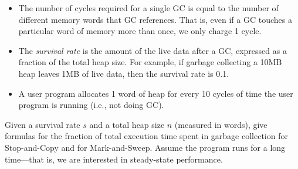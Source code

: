 \documentclass{article}
\begin{document}
\begin{enumerate}
\begin{itemize}
\item The number of cycles required for a single GC is equal to the number
of different memory words that GC references. That is, even if a GC
touches a particular word of memory more than once, we only charge 1
cycle.

\item The \emph{survival rate} is the amount of the live data after a GC,
expressed as a fraction of the total heap size. For example, if garbage
collecting a 10MB heap leaves 1MB of live data, then the survival rate is
0.1.

\item A user program allocates 1 word of heap for every 10 cycles of time
the user program is running (i.e., not doing GC).

\end{itemize}

Given a survival rate $s$ and a total heap size $n$ (measured in words),
give formulas for the fraction of total execution time spent in garbage
collection for Stop-and-Copy and for Mark-and-Sweep. Assume the program
runs for a long time---that is, we are interested in steady-state
performance.

\end{enumerate}
\end{document}
